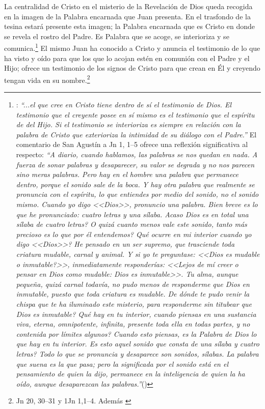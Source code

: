 \documentclass[12pt]{article}
\begin{document}
{La centralidad de Cristo en el misterio de la Revelación de Dios queda recogida en la imagen de la Palabra encarnada que Juan presenta. En el trasfondo de la tesina estará presente esta imagen; la Palabra encarnada que es Cristo en donde se revela el rostro del Padre. Es Palabra que se acoge, se interioriza y se comunica.\footnote{\cite[1530]{dicctf}: \emph{``...el que cree en Cristo tiene dentro de sí el testimonio de Dios. El testimonio que el creyente posee en sí mismo es el testimonio que el espíritu de del Hijo. Si el testimonio se interioriza es siempre en relación con la palabra de Cristo que exterioriza la intimidad de su diálogo con el Padre.''} El comentario de San Agustín a Jn 1, 1--5 ofrece una reflexión significativa al respecto:
\emph{``A diario, cuando hablamos, las palabras se nos quedan en nada. A fuerza de sonar palabras y desaparecer, su valor se degrada y no nos parecen sino meras palabras. Pero hay en el hombre una palabra que permanece dentro, porque el sonido sale de la boca. Y hay otra palabra que realmente se pronuncia con el espíritu, lo que entiendes por medio del sonido, no el sonido mismo. Cuando yo digo <<Dios>>, pronuncio una palabra. Bien breve es lo que he pronunciado: cuatro letras y una sílaba. \textquestiondown Acaso Dios es en total una sílaba de cuatro letras? \textquestiondown O quizá cuanto menos vale este sonido, tanto más precioso es lo que por él entendemos? \textquestiondown Qué ocurre en mi interior cuando yo digo <<Dios>>? He pensado en un ser supremo, que trasciende toda criatura mudable, carnal y animal. Y si yo te preguntase: <<\textquestiondown Dios es mudable o inmutable?>>, inmediatamente responderías: <<Lejos de mí creer o pensar en Dios como mudable: Dios es inmutable>>. Tu alma, aunque pequeña, quizá carnal todavía, no pudo menos de responderme que Dios en inmutable, puesto que toda criatura es mudable. \textquestiondown De dónde te pudo venir la chispa que te ha iluminado este misterio, para responderme sin titubear que Dios es inmutable? \textquestiondown Qué hay en tu interior, cuando piensas en una sustancia viva, eterna, omnipotente, infinita, presente toda ella en todas partes, y no contenida por límites algunos? Cuando esto piensas, es la Palabra de Dios lo que hay en tu interior. \textquestiondown Es esto aquel sonido que consta de una sílaba y cuatro letras? Todo lo que se pronuncia y desaparece son sonidos, sílabas. La palabra que suena es la que pasa; pero la significada por el sonido está en el pensamiento de quien la dijo, permanece en la inteligencia de quien la ha oído, aunque desaparezcan las palabras.''}(\cite[n.~1, 8]{aguscomentjn})
}
El mismo Juan ha conocido a Cristo y anuncia el testimonio de lo que ha visto y oído para que los que lo acojan estén en comunión con el Padre y el Hijo; ofrece un testimonio de los signos de Cristo para que crean en Él y creyendo tengan vida en su nombre.\footnote{Jn 20, 30--31 y 1Jn 1,1--4. Además \cite[1530]{dicctf}} 

}
\end{document}
